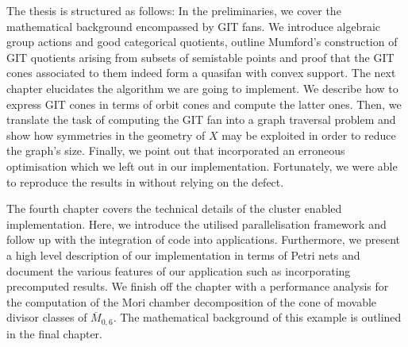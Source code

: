 The thesis is structured as follows: In the preliminaries, we cover the mathematical background encompassed by GIT fans. We introduce algebraic group actions and good categorical quotients, outline Mumford's construction of GIT quotients arising from subsets of semistable points and proof that the GIT cones associated to them indeed form a quasifan with convex support. The next chapter elucidates the algorithm we are going to implement. We describe how to express GIT cones in terms of orbit cones and compute the latter ones. Then, we translate the task of computing the GIT fan into a graph traversal problem and show how symmetries in the geometry of $X$ may be exploited in order to reduce the graph's size. Finally, we point out that \cite{gitfan_symmetry} incorporated an erroneous optimisation which we left out in our implementation. Fortunately, we were able to reproduce the results in \cite{gitfan_symmetry} without relying on the defect.

The fourth chapter covers the technical details of the cluster enabled implementation. Here, we introduce the utilised parallelisation framework \gpispace{} and follow up with the integration of \singular{} code into \gpispace{} applications. Furthermore, we present a high level description of our implementation in terms of Petri nets and document the various features of our application such as incorporating precomputed results. We finish off the chapter with a performance analysis for the computation of the Mori chamber decomposition of the cone of movable divisor classes of $\overline{M}_{0,6}$. The mathematical background of this example is outlined in the final chapter.
